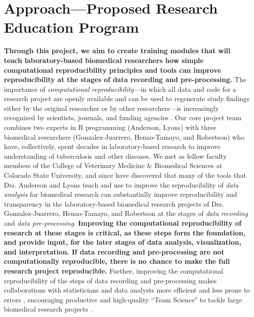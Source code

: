 \documentclass[pdftex,english,11.5pt,parskip=half]{scrartcl}
\begin{document}
\section{Approach---Proposed Research Education Program}

\textbf{Through this project, we aim to create training modules that will teach laboratory-based biomedical
researchers how simple computational reproducibility principles and tools can improve
reproducibility at the stages of data recording and
pre-processing.} The importance of \textit{computational reproducibility}---in which all
data and code for a research project are openly available and can be used to regenerate study findings either by the original researcher or by
other researchers---is increasingly recognized by scientists, journals, and funding
agencies \cite{ellis2018share, ram2013git}.
Our core project team combines two experts in R programming
(Anderson, Lyons) with three biomedical researchers (Gonzalez-Juarrero,
Henao-Tamayo, and Robertson) who have, collectively, spent decades in
laboratory-based research to improve understanding of tuberculosis and other
diseases. We met as fellow faculty members of the College of Veterinary Medicine \& Biomedical Sciences at Colorado State
University, and since have discovered that many of the tools that Drs. Anderson
and Lyons teach and use to improve the reproducibility of \textit{data analysis}
for biomedical research can substantially improve reproducibility and
transparency in the laboratory-based biomedical research projects of Drs.
Gonzalez-Juarrero, Henao-Tamayo, and Robertson at the stages of \textit{data
recording} and \textit{data pre-processing}. \textbf{Improving the computational 
reproducibility of research at these stages is critical, as these steps form the foundation, and 
provide input, for the later stages of data analysis, visualization, and 
interpretation. If data recording and pre-processing are not computationally reproducible, there is no chance to make the full research project reproducible.} 
Further, improving the computational reproducibility of the steps of data recording and pre-processing makes collaborations with
statisticians 
and data analysts more efficient and less prone to errors \cite{ellis2018share},  encouraging productive and high-quality ``Team Science" to tackle large biomedical research projects \cite{munafo2017manifesto}.
\end{document}
